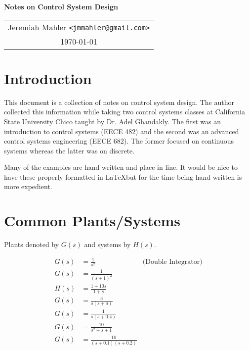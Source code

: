 \documentclass{article}
\begin{document}

\vspace*{0.5in}

\centerline{\LARGE \textbf{Notes on Control System Design}}
\vspace{0.2in}

\begin{center}
\begin{tabular}{c}
Jeremiah Mahler \texttt{<jmmahler@gmail.com>} \\
\today
\end{tabular}
\end{center}

\thispagestyle{empty}
\vfill
\pagebreak


\tableofcontents

\clearpage

\section{Introduction}

This document is a collection of notes on control system design.
The author collected this information while taking two control systems
classes at California State University Chico taught by Dr. Adel Ghandakly.
The first was an introduction to control systems (EECE 482) and
the second was an advanced control systems engineering (EECE 682).
The former focused on continuous systems whereas the latter was on
discrete.

Many of the examples are hand written and place in line.
It would be nice to have these properly formatted in \LaTeX but
for the time being hand written is more expedient.

\section{Common Plants/Systems}

\nocite{ogata1995discrete}
\nocite{franklin1998digital}

Plants denoted by $G(s)$ and systems by $H(s)$.

\begin{align*}
	G(s) &= \frac{1}{s^2} & \mbox{(Double Integrator)}\\
	G(s) &= \frac{1}{(s + 1)^2} \\
	H(s) &= \frac{1 + 10s}{1 + s} \\
	G(s) &= \frac{a}{s(s + a)} \\
	G(s) &= \frac{1}{s(s + 0.4)} \\
	G(s) &= \frac{10}{s^2 + s + 1} \\
	G(s) &= \frac{10}{(s + 0.1)(s + 0.2)}
\end{align*}
\end{document}
